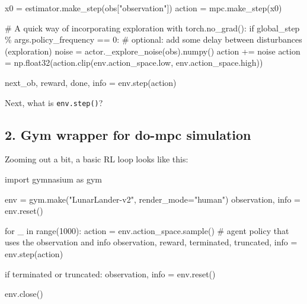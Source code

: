 \documentclass[
  letterpaper,
  DIV=11,
  numbers=noendperiod,
  oneside]{scrartcl}
\newenvironment{Shaded}{\begin{snugshade}}{\end{snugshade}}
\newcommand{\BuiltInTok}[1]{\textcolor[rgb]{0.00,0.23,0.31}{#1}}
\newcommand{\CommentTok}[1]{\textcolor[rgb]{0.37,0.37,0.37}{#1}}
\newcommand{\ControlFlowTok}[1]{\textcolor[rgb]{0.00,0.23,0.31}{#1}}
\newcommand{\DecValTok}[1]{\textcolor[rgb]{0.68,0.00,0.00}{#1}}
\newcommand{\ImportTok}[1]{\textcolor[rgb]{0.00,0.46,0.62}{#1}}
\newcommand{\KeywordTok}[1]{\textcolor[rgb]{0.00,0.23,0.31}{#1}}
\newcommand{\NormalTok}[1]{\textcolor[rgb]{0.00,0.23,0.31}{#1}}
\newcommand{\OperatorTok}[1]{\textcolor[rgb]{0.37,0.37,0.37}{#1}}
\newcommand{\StringTok}[1]{\textcolor[rgb]{0.13,0.47,0.30}{#1}}
\begin{document}
\begin{Shaded}
\begin{Highlighting}[numbers=left,,]
\NormalTok{x0 }\OperatorTok{=}\NormalTok{ estimator.make\_step(obs[}\StringTok{"observation"}\NormalTok{])}
\NormalTok{action }\OperatorTok{=}\NormalTok{ mpc.make\_step(x0)}

\CommentTok{\# A quick way of incorporating exploration}
\ControlFlowTok{with}\NormalTok{ torch.no\_grad():}
    \ControlFlowTok{if}\NormalTok{ global\_step }\OperatorTok{\%}\NormalTok{ args.policy\_frequency }\OperatorTok{==} \DecValTok{0}\NormalTok{: }\CommentTok{\# optional: add some delay between disturbances (exploration)}
\NormalTok{        noise }\OperatorTok{=}\NormalTok{ actor.\_explore\_noise(obs).numpy()}
\NormalTok{        action }\OperatorTok{+=}\NormalTok{ noise}
\NormalTok{        action }\OperatorTok{=}\NormalTok{ np.float32(action.clip(env.action\_space.low, env.action\_space.high))}

\NormalTok{next\_ob, reward, done, info }\OperatorTok{=}\NormalTok{ env.step(action)}
\end{Highlighting}
\end{Shaded}

Next, what is \texttt{env.step()}?

\subsection{2. Gym wrapper for do-mpc
simulation}\label{gym-wrapper-for-do-mpc-simulation}

Zooming out a bit, a basic RL loop looks like this:

\begin{Shaded}
\begin{Highlighting}[numbers=left,,]
\ImportTok{import}\NormalTok{ gymnasium }\ImportTok{as}\NormalTok{ gym}

\NormalTok{env }\OperatorTok{=}\NormalTok{ gym.make(}\StringTok{"LunarLander{-}v2"}\NormalTok{, render\_mode}\OperatorTok{=}\StringTok{"human"}\NormalTok{)}
\NormalTok{observation, info }\OperatorTok{=}\NormalTok{ env.reset()}

\ControlFlowTok{for}\NormalTok{ \_ }\KeywordTok{in} \BuiltInTok{range}\NormalTok{(}\DecValTok{1000}\NormalTok{):}
\NormalTok{    action }\OperatorTok{=}\NormalTok{ env.action\_space.sample()  }\CommentTok{\# agent policy that uses the observation and info}
\NormalTok{    observation, reward, terminated, truncated, info }\OperatorTok{=}\NormalTok{ env.step(action)}

    \ControlFlowTok{if}\NormalTok{ terminated }\KeywordTok{or}\NormalTok{ truncated:}
\NormalTok{        observation, info }\OperatorTok{=}\NormalTok{ env.reset()}

\NormalTok{env.close()}
\end{Highlighting}
\end{Shaded}
\end{document}
